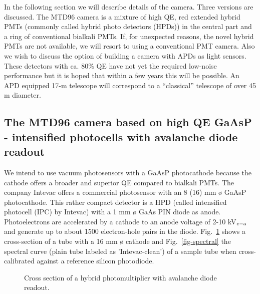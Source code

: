 In the following section we will describe details of the camera. Three
versions are discussed. The MTD96 camera is a mixture of high QE, red
extended hybrid PMTs (commonly called hybrid photo detectors (HPDs)) 
in the central part and a ring of
conventional bialkali PMTs. If, for unexpected reasons, the novel hybrid PMTs
are not available, we will resort to using a conventional PMT camera. Also we
wish to discuss the option of building a camera with APDs as light sensors.
These detectors with ca. 80\% QE have not yet the required low-noise
performance but it is hoped that within a few years this will be possible.
An APD equipped 17-m telescope will correspond to a ``classical'' telescope
of over 45 m diameter.


\subsection{The MTD96 camera based on high QE GaAsP - intensified photocells
with avalanche diode readout}


\medskip We intend to use vacuum photosensors with a GaAsP photocathode
because the cathode offers a broader and superior QE compared to bialkali
PMTs. The company Intevac offers a commercial photosensor with an 8 (16) mm 
{\o} GaAsP photocathode. This rather compact detector is a HPD 
(called intensified photocell (IPC) by Intevac) with a 1 mm {\o} GaAs
PIN diode as anode. Photoelectrons are accelerated by a cathode to an anode
voltage of 2-10 kV$_{{\rm c-a}}$ and generate up to about 1500 electron-hole
pairs in the diode. Fig.~\ref{fig-hybrid_tube} shows a cross-section of 
a tube with a 16 mm {\o} cathode 
and Fig.~\ref{fig-spectral} the spectral curve (plain tube labeled
as 'Intevac-clean') of a sample
tube when cross-calibrated against a reference silicon photodiode.

\begin{figure}[htb]
\leavevmode
\centering
\epsfxsize=10cm
\caption{Cross section of a hybrid
photomultiplier with avalanche diode readout.}
\label{fig-hybrid_tube}
\end{figure}


